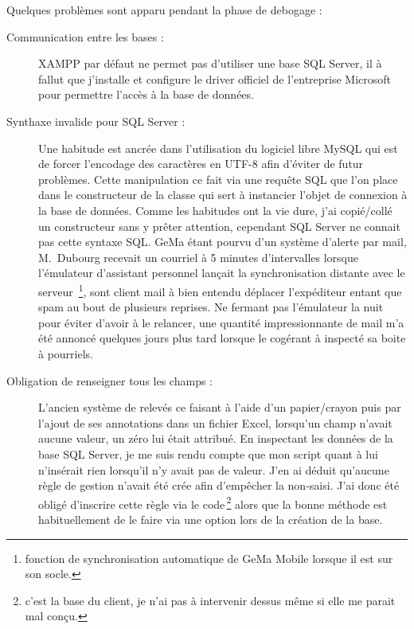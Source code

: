 Quelques problèmes sont apparu pendant la phase de debogage :
\begin{description}

  \item[Communication entre les bases :] XAMPP par défaut ne permet pas
    d'utiliser une base SQL Server, il à fallut que j'installe et
    configure le driver officiel de l'entreprise
    Microsoft pour permettre l'accès à la base de
    données.

  \item[Synthaxe invalide pour SQL Server :] Une habitude est ancrée
    dans l'utilisation du logiciel libre MySQL qui est de forcer
    l'encodage des caractères en UTF-8 afin d'éviter de futur problèmes.
    Cette manipulation ce fait via une requête SQL que l'on place dans
    le constructeur de la classe qui sert à instancier l'objet de
    connexion à la base de données. Comme les habitudes ont la vie dure,
    j'ai copié/collé un constructeur sans y prêter attention, cependant
    SQL Server ne connait pas cette syntaxe SQL. GeMa étant pourvu d'un
    système d'alerte par mail, M.~Dubourg recevait un courriel à 5
    minutes d'intervalles lorsque l'émulateur d'assistant personnel
    lançait la synchronisation distante avec le serveur\,
    \footnote{fonction de synchronisation automatique de GeMa Mobile
    lorsque il est sur son socle.}, sont client mail à bien entendu
    déplacer l'expéditeur entant que spam au bout de plusieurs reprises.
    Ne fermant pas l'émulateur la nuit pour éviter d'avoir à le
    relancer, une quantité impressionnante de mail m'a été annoncé
    quelques jours plus tard lorsque le cogérant à inspecté sa boite à
    pourriels.

  \item[Obligation de renseigner tous les champs :] L'ancien système de
    relevés ce faisant à l'aide d'un papier/crayon puis par l'ajout de
    ses annotations dans un fichier Excel, lorsqu'un champ n'avait
    aucune valeur, un zéro lui était attribué. En inspectant les données
    de la base SQL Server, je me suis rendu compte que mon script quant
    à lui n'insérait rien lorsqu'il n'y avait pas de valeur. J'en ai
    déduit qu'aucune règle de gestion n'avait été crée afin d'empêcher
    la non-saisi. J'ai donc été obligé d'inscrire cette règle via le
    code\,\footnote{c'est la base du client, je n'ai pas à intervenir
    dessus même si elle me parait mal conçu.} alors que la bonne méthode
    est habituellement de le faire via une option lors de la création de
    la base.

\end{description}
